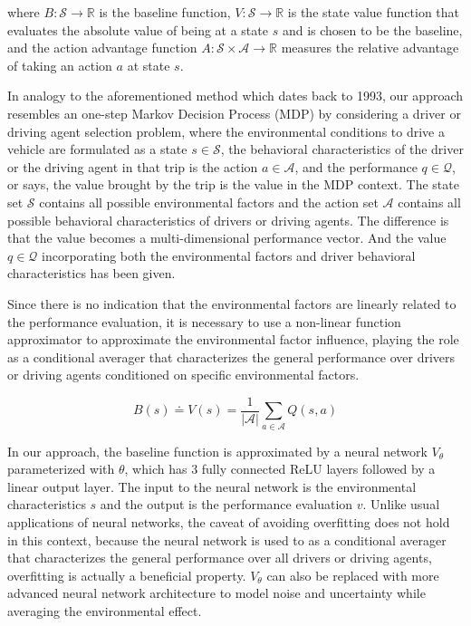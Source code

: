 \documentclass{article}
\begin{document}
where $ B: \mathcal{S} \rightarrow \mathbb{R} $ is the baseline function, $ V: \mathcal{S} \rightarrow \mathbb{R} $ is the state value function that evaluates the absolute value of being at a state $ s $ and is chosen to be the baseline, and the action advantage function $ A: \mathcal{S} \times \mathcal{A} \rightarrow \mathbb{R} $ measures the relative advantage of taking an action $ a $ at state $ s $.

In analogy to the aforementioned method \cite{baird1993advantage} which dates back to 1993, our approach resembles an one-step Markov Decision Process (MDP) by considering a driver or driving agent selection problem, where the environmental conditions to drive a vehicle are formulated as a state $ s \in \mathcal{S} $, the behavioral characteristics of the driver or the driving agent in that trip is the action $ a \in \mathcal{A} $, and the performance $ q \in \mathcal{Q} $, or says, the value brought by the trip is the value in the MDP context. The state set $ \mathcal{S} $ contains all possible environmental factors and the action set $ \mathcal{A} $ contains all possible behavioral characteristics of drivers or driving agents. The difference is that the value becomes a multi-dimensional performance vector. And the value $ q \in \mathcal{Q} $ incorporating both the environmental factors and driver behavioral characteristics has been given.

Since there is no indication that the environmental factors are linearly related to the performance evaluation, it is necessary to use a non-linear function approximator to approximate the environmental factor influence, playing the role as a conditional averager that characterizes the general performance over drivers or driving agents conditioned on specific environmental factors.

\[
B(s) \doteq V(s) = \frac{1}{ |\mathcal{A}| } \sum_{a \in \mathcal{A}} Q(s, a)
\]

In our approach, the baseline function is approximated by a neural network $ V_{\theta} $ parameterized with $ \theta $, which has $ 3 $ fully connected ReLU layers followed by a linear output layer. The input to the neural network is the environmental characteristics $ s $ and the output is the performance evaluation $ v $. Unlike usual applications of neural networks, the caveat of avoiding overfitting does not hold in this context, because the neural network is used to as a conditional averager that characterizes the general performance over all drivers or driving agents, overfitting is actually a beneficial property. $ V_{\theta} $ can also be replaced with more advanced neural network architecture \cite{yamaguchi2016neural} to model noise and uncertainty while averaging the environmental effect.
\end{document}
